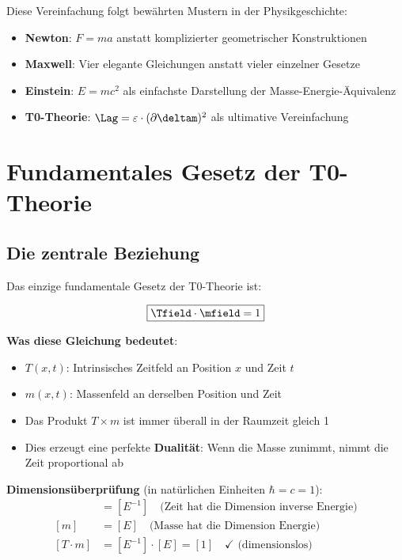 	Diese Vereinfachung folgt bewährten Mustern in der Physikgeschichte:
	\begin{itemize}
		\item \textbf{Newton}: $F = ma$ anstatt komplizierter geometrischer Konstruktionen
		\item \textbf{Maxwell}: Vier elegante Gleichungen anstatt vieler einzelner Gesetze
		\item \textbf{Einstein}: $E = mc^2$ als einfachste Darstellung der Masse-Energie-Äquivalenz
		\item \textbf{T0-Theorie}: $\Lag = \varepsilon \cdot (\partial \deltam)^2$ als ultimative Vereinfachung
	\end{itemize}
	
	\section{Fundamentales Gesetz der T0-Theorie}
	
	\subsection{Die zentrale Beziehung}
	
	Das einzige fundamentale Gesetz der T0-Theorie ist:
	
	\begin{equation}
		\boxed{\Tfield \cdot \mfield = 1}
		\label{eq:fundamental_law}
	\end{equation}
	
	\textbf{Was diese Gleichung bedeutet}:
	\begin{itemize}
		\item $T(x,t)$: Intrinsisches Zeitfeld an Position $x$ und Zeit $t$
		\item $m(x,t)$: Massenfeld an derselben Position und Zeit
		\item Das Produkt $T \times m$ ist immer überall in der Raumzeit gleich 1
		\item Dies erzeugt eine perfekte \textbf{Dualität}: Wenn die Masse zunimmt, nimmt die Zeit proportional ab
	\end{itemize}
	
	\textbf{Dimensionsüberprüfung} (in natürlichen Einheiten $\hbar = c = 1$):
	\begin{align}
		[T] &= [E^{-1}] \quad \text{(Zeit hat die Dimension inverse Energie)} \\
		[m] &= [E] \quad \text{(Masse hat die Dimension Energie)} \\
		[T \cdot m] &= [E^{-1}] \cdot [E] = [1] \quad \checkmark \text{ (dimensionslos)}
	\end{align}
	

